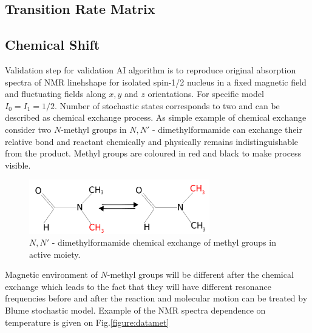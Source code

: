 \subsection{Transition Rate Matrix}
\subsection{Chemical Shift}\label{blumeinitialmodel}
Validation step for validation AI algorithm is to reproduce original absorption spectra of NMR linehshape for isolated spin-1/2 nucleus in a fixed magnetic field and fluctuating fields along $x,y$ and $z$ orientations. For specific model $I_0=I_1=1/2$. Number of stochastic states corresponds to two and can be described as chemical exchange process. As simple example of chemical exchange consider two $N$-methyl groups in $N,N'$ - dimethylformamide can exchange their relative bond and reactant chemically and physically remains indistinguishable from the product. Methyl groups are coloured in red and black to make process visible.       
\begin{figure}[h!]
\centering
\includegraphics[width=0.7\textwidth]{figures/chap2/methil.png}
\caption{$N,N'$ -
dimethylformamide chemical exchange of methyl groups in active moiety.}
\label{figure:methyl}
\end{figure}
Magnetic environment of $N$-methyl groups will be different after the chemical exchange which leads to the fact that they will have different resonance frequencies before and after the reaction and molecular motion can be treated by Blume stochastic model. Example of the NMR spectra dependence on temperature is given on Fig.\ref{figure:datamet} 

